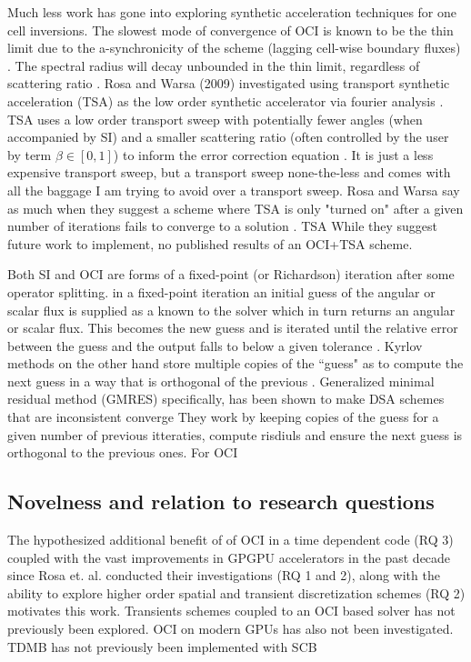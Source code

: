 Much less work has gone into exploring synthetic acceleration techniques for one cell inversions.
The slowest mode of convergence of OCI is known to be the thin limit due to the a-synchronicity of the scheme (lagging cell-wise boundary fluxes) \cite{hoagland_hybrid_2021}.
The spectral radius will decay unbounded in the thin limit, regardless of scattering ratio \cite{rosa_cellwise_2013}.
Rosa and Warsa (2009) investigated using transport synthetic acceleration (TSA) as the low order synthetic accelerator via fourier analysis \cite{tsa2009rosa, tsa_slab2006rosa, tsa_2d2007rosa}.
TSA uses a low order transport sweep with potentially fewer angles (when accompanied by SI) and a smaller scattering ratio (often controlled by the user by term $\beta \in [0,1]$) to inform the error correction equation \cite{tsa1997gilles}.
It is just a less expensive transport sweep, but a transport sweep none-the-less and comes with all the baggage I am trying to avoid over a transport sweep.
Rosa and Warsa say as much when they suggest a scheme where TSA is only "turned on" after a given number of iterations fails to converge to a solution \cite{tsa2009rosa}.
TSA
While they suggest future work to implement, no published results of an OCI+TSA scheme.

Both SI and OCI are forms of a fixed-point (or Richardson) iteration after some operator splitting.
in a fixed-point iteration an initial guess of the angular or scalar flux is supplied as a known to the solver which in turn returns an angular or scalar flux.
This becomes the new guess and is iterated until the relative error between the guess and the output falls to below a given tolerance \cite{lewis1984computational}.
Kyrlov methods on the other hand store multiple copies of the ``guess" as to compute the next guess in a way that is orthogonal of the previous \cite{gmres1996kelley, patton_application_2002}.
Generalized minimal residual method (GMRES) specifically, has been shown to make DSA schemes that are inconsistent converge \cite{kylov2004warsa}
They work by keeping copies of the guess for a given number of previous itteraties, compute risdiuls and ensure the next guess is orthogonal to the previous ones\cite{subspace2004warsa}.
For OCI 

\subsection{Novelness and relation to research questions}

The hypothesized additional benefit of of OCI in a time dependent code (RQ 3) coupled with the vast improvements in GPGPU accelerators in the past decade since Rosa et. al. \cite{rosa_cellwise_2013} conducted their investigations (RQ 1 and 2), along with the ability to explore higher order spatial and transient discretization schemes (RQ 2) motivates this work.
Transients schemes coupled to an OCI based solver has not previously been explored.
OCI on modern GPUs has also not been investigated.
TDMB has not previously been implemented with SCB

